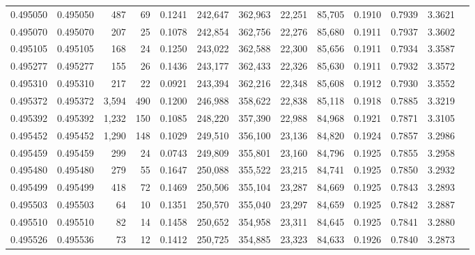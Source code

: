 \begin{tabular}{rrrrrrrrrrrrr}
0.495050 & 0.495050 &   487 &    69 &                                     0.1241 & 242,647 & 362,963 &  22,251 &  85,705 & 0.1910 & 0.7939 & 3.3621 \\
0.495070 & 0.495070 &   207 &    25 &                                     0.1078 & 242,854 & 362,756 &  22,276 &  85,680 & 0.1911 & 0.7937 & 3.3602 \\
0.495105 & 0.495105 &   168 &    24 &                                     0.1250 & 243,022 & 362,588 &  22,300 &  85,656 & 0.1911 & 0.7934 & 3.3587 \\
0.495277 & 0.495277 &   155 &    26 &                                     0.1436 & 243,177 & 362,433 &  22,326 &  85,630 & 0.1911 & 0.7932 & 3.3572 \\
0.495310 & 0.495310 &   217 &    22 &                                     0.0921 & 243,394 & 362,216 &  22,348 &  85,608 & 0.1912 & 0.7930 & 3.3552 \\
0.495372 & 0.495372 & 3,594 &   490 &                                     0.1200 & 246,988 & 358,622 &  22,838 &  85,118 & 0.1918 & 0.7885 & 3.3219 \\
0.495392 & 0.495392 & 1,232 &   150 &                                     0.1085 & 248,220 & 357,390 &  22,988 &  84,968 & 0.1921 & 0.7871 & 3.3105 \\
0.495452 & 0.495452 & 1,290 &   148 &                                     0.1029 & 249,510 & 356,100 &  23,136 &  84,820 & 0.1924 & 0.7857 & 3.2986 \\
0.495459 & 0.495459 &   299 &    24 &                                     0.0743 & 249,809 & 355,801 &  23,160 &  84,796 & 0.1925 & 0.7855 & 3.2958 \\
0.495480 & 0.495480 &   279 &    55 &                                     0.1647 & 250,088 & 355,522 &  23,215 &  84,741 & 0.1925 & 0.7850 & 3.2932 \\
0.495499 & 0.495499 &   418 &    72 &                                     0.1469 & 250,506 & 355,104 &  23,287 &  84,669 & 0.1925 & 0.7843 & 3.2893 \\
0.495503 & 0.495503 &    64 &    10 &                                     0.1351 & 250,570 & 355,040 &  23,297 &  84,659 & 0.1925 & 0.7842 & 3.2887 \\
0.495510 & 0.495510 &    82 &    14 &                                     0.1458 & 250,652 & 354,958 &  23,311 &  84,645 & 0.1925 & 0.7841 & 3.2880 \\
0.495526 & 0.495536 &    73 &    12 &                                     0.1412 & 250,725 & 354,885 &  23,323 &  84,633 & 0.1926 & 0.7840 & 3.2873 \\

\end{tabular}
